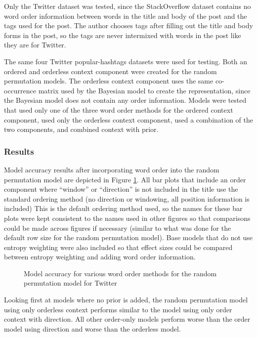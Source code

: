 \documentclass[man,floatsintext,donotrepeattitle]{apa6}
\begin{document}
Only the Twitter dataset was tested, since the StackOverflow dataset contains no word order information between words in the title and body of the post and the tags used for the post.
The author chooses tags after filling out the title and body forms in the post, so the tags are never intermixed with words in the post like they are for Twitter.

The same four Twitter popular-hashtags datasets were used for testing.
Both an ordered and orderless context component were created for the random permutation models.
The orderless context component uses the same co-occurrence matrix used by the Bayesian model to create the representation, since the Bayesian model does not contain any order information.
Models were tested that used only one of the three word order methods for the ordered context component, used only the orderless context component, used a combination of the two components, and combined context with prior. 

\subsubsection{Results}

Model accuracy results after incorporating word order into the random permutation model are depicted in Figure \ref{figContextOrder}.
All bar plots that include an order component where ``window'' or ``direction'' is not included in the title use the standard ordering method (no direction or windowing, all position information is included) 
This is the default ordering method used, so the names for these bar plots were kept consistent to the names used in other figures so that comparisons could be made across figures if necessary
(similar to what was done for the default row size for the random permutation model).
Base models that do not use entropy weighting were also included so that effect sizes could be compared between entropy weighting and adding word order information.

\begin{figure}[!htbp]
  \caption{Model accuracy for various word order methods for the random permutation model for Twitter}
  \label{figContextOrder}
\end{figure}

Looking first at models where no prior is added, the random permutation model using only orderless context performs similar to the model using only order context with direction.
All other order-only models perform worse than the order model using direction and worse than the orderless model.
\end{document}
